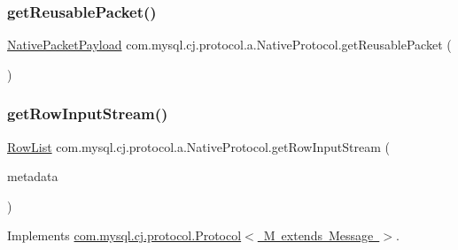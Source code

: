 \mbox{\label{classcom_1_1mysql_1_1cj_1_1protocol_1_1a_1_1_native_protocol_a0740b0da6d971cff9f66cfd9e4414511}} 
\subsubsection{\texorpdfstring{get\+Reusable\+Packet()}{getReusablePacket()}}
{\footnotesize\ttfamily \mbox{\hyperlink{classcom_1_1mysql_1_1cj_1_1protocol_1_1a_1_1_native_packet_payload}{Native\+Packet\+Payload}} com.\+mysql.\+cj.\+protocol.\+a.\+Native\+Protocol.\+get\+Reusable\+Packet (\begin{DoxyParamCaption}{ }\end{DoxyParamCaption})}

\mbox{\label{classcom_1_1mysql_1_1cj_1_1protocol_1_1a_1_1_native_protocol_a6bb695c2fd2b3492490208c56b23ebd4}} 
\subsubsection{\texorpdfstring{get\+Row\+Input\+Stream()}{getRowInputStream()}}
{\footnotesize\ttfamily \mbox{\hyperlink{interfacecom_1_1mysql_1_1cj_1_1result_1_1_row_list}{Row\+List}} com.\+mysql.\+cj.\+protocol.\+a.\+Native\+Protocol.\+get\+Row\+Input\+Stream (\begin{DoxyParamCaption}\item[{\mbox{\hyperlink{interfacecom_1_1mysql_1_1cj_1_1protocol_1_1_column_definition}{Column\+Definition}}}]{metadata }\end{DoxyParamCaption})}



Implements \mbox{\hyperlink{interfacecom_1_1mysql_1_1cj_1_1protocol_1_1_protocol_a9e859d7ef531819c5bdef288f650ab83}{com.\+mysql.\+cj.\+protocol.\+Protocol$<$ M extends Message $>$}}.

